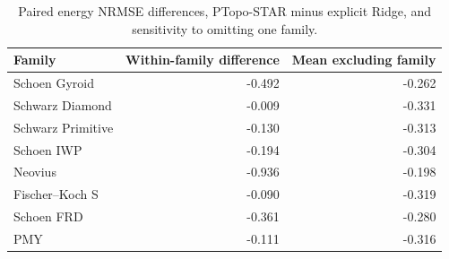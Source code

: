\begin{table}[ht]
\centering
\caption{Paired energy NRMSE differences, PTopo-STAR minus explicit Ridge, and sensitivity to omitting one family.}
\label{tab:s6_omission}
\begin{tabular}{lrr}
\toprule
Family & Within-family difference & Mean excluding family\\
\midrule
Schoen Gyroid & -0.492 & -0.262\\
Schwarz Diamond & -0.009 & -0.331\\
Schwarz Primitive & -0.130 & -0.313\\
Schoen IWP & -0.194 & -0.304\\
Neovius & -0.936 & -0.198\\
Fischer--Koch S & -0.090 & -0.319\\
Schoen FRD & -0.361 & -0.280\\
PMY & -0.111 & -0.316\\
\bottomrule
\end{tabular}
\end{table}